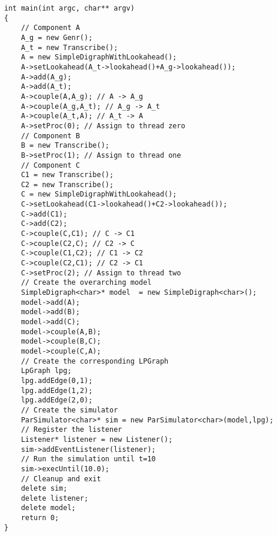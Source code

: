\begin{verbatim}
int main(int argc, char** argv)
{
	// Component A
	A_g = new Genr();
	A_t = new Transcribe();
	A = new SimpleDigraphWithLookahead();
	A->setLookahead(A_t->lookahead()+A_g->lookahead());
	A->add(A_g);
	A->add(A_t);
	A->couple(A,A_g); // A -> A_g
	A->couple(A_g,A_t); // A_g -> A_t
	A->couple(A_t,A); // A_t -> A
	A->setProc(0); // Assign to thread zero
	// Component B
	B = new Transcribe();
	B->setProc(1); // Assign to thread one
	// Component C
	C1 = new Transcribe();
	C2 = new Transcribe();
	C = new SimpleDigraphWithLookahead();
	C->setLookahead(C1->lookahead()+C2->lookahead());
	C->add(C1);
	C->add(C2);
	C->couple(C,C1); // C -> C1
	C->couple(C2,C); // C2 -> C
	C->couple(C1,C2); // C1 -> C2
	C->couple(C2,C1); // C2 -> C1
	C->setProc(2); // Assign to thread two
	// Create the overarching model
	SimpleDigraph<char>* model  = new SimpleDigraph<char>();
	model->add(A);
	model->add(B);
	model->add(C);
	model->couple(A,B);
	model->couple(B,C);
	model->couple(C,A);
	// Create the corresponding LPGraph
	LpGraph lpg;
	lpg.addEdge(0,1);
	lpg.addEdge(1,2);
	lpg.addEdge(2,0);
	// Create the simulator
	ParSimulator<char>* sim = new ParSimulator<char>(model,lpg);
	// Register the listener
	Listener* listener = new Listener();
	sim->addEventListener(listener);
	// Run the simulation until t=10
	sim->execUntil(10.0);
	// Cleanup and exit
	delete sim;
	delete listener;
	delete model;
	return 0;
}
\end{verbatim}

